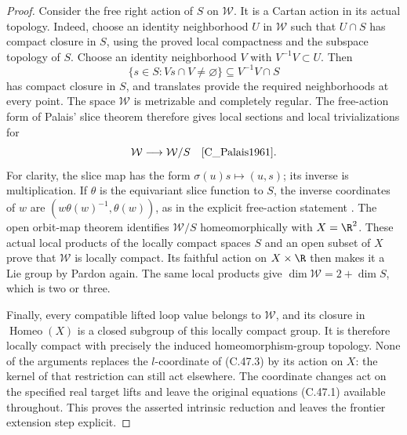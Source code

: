 \begin{proof}
Consider the free right action of $S$ on $\mathcal W$.
It is a Cartan action in its actual topology.
Indeed, choose an identity neighborhood $U$ in $\mathcal W$
such that $U\cap S$ has compact closure in $S$, using the
proved local compactness and the subspace topology of $S$.
Choose an identity neighborhood $V$ with $V^{-1}V\subset U$.
Then
\[
       \{s\in S:Vs\cap V\ne\varnothing\}
                   \subseteq V^{-1}V\cap S
 \]
has compact closure in $S$, and translates provide the
required neighborhoods at every point.
The space $\mathcal W$ is metrizable and completely regular.
The free-action form of Palais' slice theorem therefore gives
local sections and local trivializations for
\[
                  \mathcal W\longrightarrow\mathcal W/S
 \quad\cite[Theorem~2.3.3]{C_Palais1961}.
 \]
For clarity, the slice map has the form
$\sigma(u)s\mapsto(u,s)$; its inverse is multiplication.
If $\theta$ is the equivariant slice function to $S$, the
inverse coordinates of $w$ are
$(w\theta(w)^{-1},\theta(w))$, as in the explicit free-action
statement \cite[Theorem~3.7]{C_KramerMuratGarcia2026}.
The open orbit-map theorem identifies
$\mathcal W/S$ homeomorphically with $X=\R^2$.
These actual local products of the locally compact spaces
$S$ and an open subset of $X$ prove that $\mathcal W$ is
locally compact. Its faithful action on $X\times\R$ then
makes it a Lie group by Pardon again.
The same local products give
$\dim\mathcal W=2+\dim S$, which is two or three.

Finally, every compatible lifted loop value belongs to
$\mathcal W$, and its closure in $\operatorname{Homeo}(X)$
is a closed subgroup of this locally compact group.
It is therefore locally compact with precisely the induced
homeomorphism-group topology.
None of the arguments replaces the $l$-coordinate of
(C.47.3) by its action on $X$: the kernel of that restriction
can still act elsewhere.
The coordinate changes act on the specified real target lifts
and leave the original equations (C.47.1) available throughout.
This proves the asserted intrinsic reduction and leaves the
frontier extension step explicit.
\end{proof}
